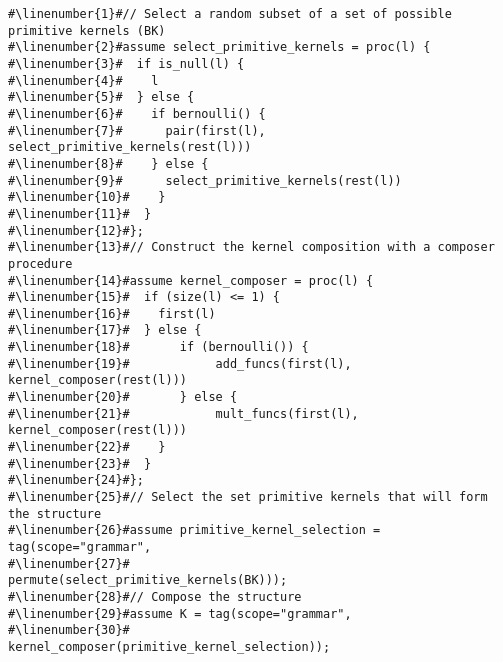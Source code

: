 \begin{mdframed}
\begin{minipage}{\linewidth}
\small
\belowcaptionskip=-10pt
\begin{lstlisting}[mathescape,label=alg:grammar,basicstyle=\selectfont\ttfamily,numbers=none,caption={
Stochastic Grammar},escapechar=\#]
#\linenumber{1}#// Select a random subset of a set of possible primitive kernels (BK)
#\linenumber{2}#assume select_primitive_kernels = proc(l) {
#\linenumber{3}#  if is_null(l) {
#\linenumber{4}#    l
#\linenumber{5}#  } else {
#\linenumber{6}#    if bernoulli() {
#\linenumber{7}#      pair(first(l), select_primitive_kernels(rest(l)))
#\linenumber{8}#    } else {
#\linenumber{9}#      select_primitive_kernels(rest(l))
#\linenumber{10}#    }
#\linenumber{11}#  }
#\linenumber{12}#};
#\linenumber{13}#// Construct the kernel composition with a composer procedure
#\linenumber{14}#assume kernel_composer = proc(l) {
#\linenumber{15}#  if (size(l) <= 1) {
#\linenumber{16}#    first(l)
#\linenumber{17}#  } else {
#\linenumber{18}#       if (bernoulli()) {
#\linenumber{19}#            add_funcs(first(l),  kernel_composer(rest(l)))
#\linenumber{20}#       } else {
#\linenumber{21}#            mult_funcs(first(l), kernel_composer(rest(l)))
#\linenumber{22}#    }
#\linenumber{23}#  }
#\linenumber{24}#};
#\linenumber{25}#// Select the set primitive kernels that will form the structure
#\linenumber{26}#assume primitive_kernel_selection = tag(scope="grammar", 
#\linenumber{27}#		              permute(select_primitive_kernels(BK)));
#\linenumber{28}#// Compose the structure
#\linenumber{29}#assume K = tag(scope="grammar", 
#\linenumber{30}#        	kernel_composer(primitive_kernel_selection));
\end{lstlisting}

\end{minipage}
\end{mdframed}
